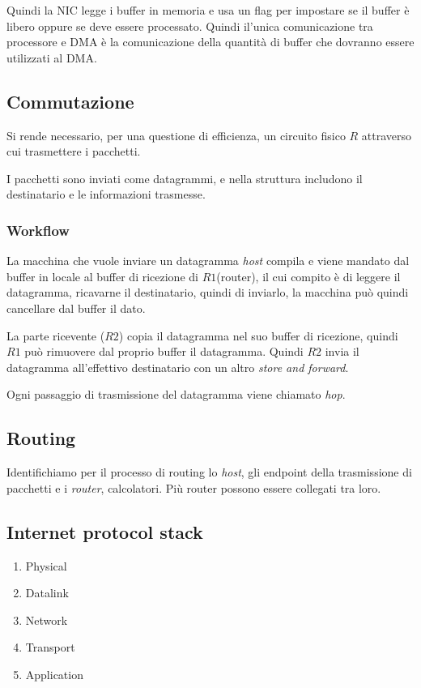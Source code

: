 Quindi la NIC legge i buffer in memoria e usa un flag per impostare se il buffer
è libero oppure se deve essere processato.
Quindi il'unica comunicazione tra processore e DMA è la comunicazione della 
quantità di buffer che dovranno essere utilizzati al DMA.

\subsection{Commutazione}
Si rende necessario, per una questione di efficienza, un circuito fisico $R$
attraverso cui trasmettere i pacchetti.

I pacchetti sono inviati come datagrammi, e nella struttura includono il
destinatario e le informazioni trasmesse.

\subsubsection{Workflow}
La macchina che vuole inviare un datagramma \emph{host} compila e viene mandato
dal buffer in locale al buffer di ricezione di $R1$(router), il cui compito è di
leggere il datagramma, ricavarne il destinatario, quindi di inviarlo, la
macchina può quindi cancellare dal buffer il dato.

La parte ricevente ($R2$) copia il datagramma nel suo buffer di ricezione,
quindi $R1$ può rimuovere dal proprio buffer il datagramma.
Quindi $R2$ invia il datagramma all'effettivo destinatario con un altro
\emph{store and forward}.

Ogni passaggio di trasmissione del datagramma viene chiamato \emph{hop}.

\subsection{Routing}
Identifichiamo per il processo di routing lo \emph{host}, gli endpoint della
trasmissione di pacchetti e i \emph{router}, calcolatori.
Più router possono essere collegati tra loro.

\subsection{Internet protocol stack}
\begin{enumerate}
  \item Physical
  \item Datalink
  \item Network
  \item Transport
  \item Application
\end{enumerate}

